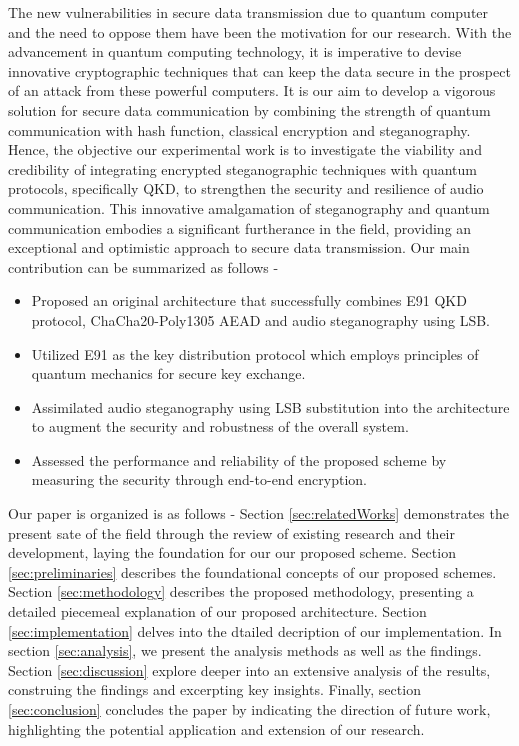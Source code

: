 \documentclass{article}
\begin{document}
The new vulnerabilities in secure data transmission due to quantum computer and the need to oppose them have been the motivation for our research. With the advancement in quantum computing technology, it is imperative to devise innovative cryptographic techniques that can keep the data secure in the prospect of an attack from these powerful computers. It is our aim to develop a vigorous solution for secure data communication by combining the strength of quantum communication with hash function, classical encryption and steganography. Hence, the objective our experimental work is to investigate the viability and credibility of integrating encrypted steganographic techniques with quantum protocols, specifically QKD, to strengthen the security and resilience of audio communication. This innovative amalgamation of steganography and quantum communication embodies a significant furtherance in the field, providing an exceptional and optimistic approach to secure data transmission. Our main contribution can be summarized as follows -
\begin{itemize}
    \item Proposed an original architecture that successfully combines E91 QKD protocol, ChaCha20-Poly1305 AEAD and audio steganography using LSB.
    \item Utilized E91 as the key distribution protocol which employs principles of quantum mechanics for secure key exchange.
    \item Assimilated audio steganography using LSB substitution into the architecture to augment the security and robustness of the overall system.
    \item Assessed the performance and reliability of the proposed scheme by measuring the security through end-to-end encryption.
\end{itemize}

Our paper is organized is as follows - Section \ref{sec:relatedWorks} demonstrates the present sate of the field through the review of existing research and their development, laying the foundation for our our proposed scheme. Section \ref{sec:preliminaries} describes the foundational concepts of our proposed schemes. Section \ref{sec:methodology} describes the proposed methodology, presenting a detailed piecemeal explanation of our proposed architecture. Section \ref{sec:implementation} delves into the dtailed decription of our implementation. In section \ref{sec:analysis}, we present the analysis methods as well as the findings. Section \ref{sec:discussion} explore deeper into an extensive analysis of the results, construing the findings and excerpting key insights. Finally, section \ref{sec:conclusion} concludes the paper by indicating the direction of future work, highlighting the potential application and extension of our research.
\end{document}
